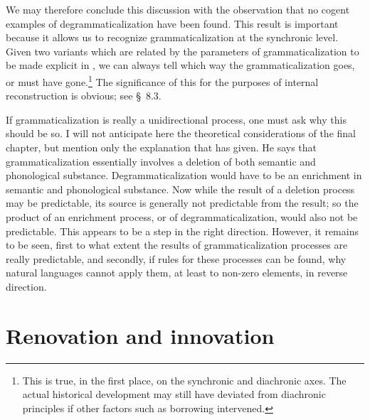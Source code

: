 We may therefore conclude this discussion with the observation that no cogent examples of degrammaticalization have been found. This result is important because it allows us to recognize grammaticalization at the synchronic level. Given two variants which are related by the parameters of grammaticalization to be made explicit in , we can always tell which way the grammaticalization goes, or must have gone.\footnote{This is true, in the first place, on the synchronic and diachronic axes. The actual historical development may still have deviated from diachronic principles if other factors such as borrowing intervened.} The significance of this for the purposes of internal reconstruction is obvious; see §~8.3.

If grammaticalization is really a unidirectional process, one must ask why this should be so. I will not anticipate here the theoretical considerations of the final chapter, but mention only the explanation that \citet[96]{Givón1975} has given. He says that grammaticalization essentially involves a deletion of both semantic and phonological substance. Degrammaticalization would have to be an enrichment in semantic and phonological substance. Now while the result of a deletion process may be predictable, its source is generally not predictable from the result; so the product of an enrichment process, or of degrammaticalization, would also not be predictable. This appears to be a step in the right direction. However, it remains to be seen, first to what extent the results of grammaticalization processes are really predictable, and secondly, if rules for these processes can be found, why natural languages cannot apply them, at least to non-zero elements, in reverse direction.

\section{Renovation and innovation}

